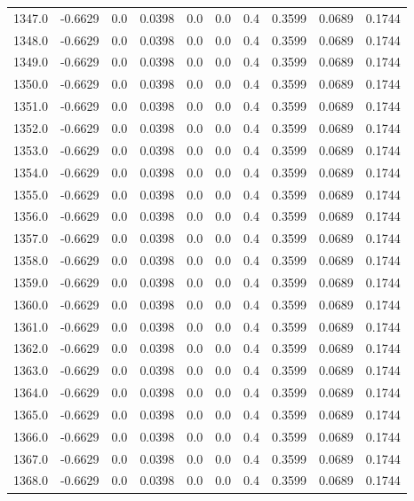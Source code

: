 \begin{longtable}{lrrrrrrrrr}
1347.0 & -0.6629 & 0.0 & 0.0398 & 0.0 & 0.0 & 0.4 & 0.3599 & 0.0689 & 0.1744 \\
1348.0 & -0.6629 & 0.0 & 0.0398 & 0.0 & 0.0 & 0.4 & 0.3599 & 0.0689 & 0.1744 \\
1349.0 & -0.6629 & 0.0 & 0.0398 & 0.0 & 0.0 & 0.4 & 0.3599 & 0.0689 & 0.1744 \\
1350.0 & -0.6629 & 0.0 & 0.0398 & 0.0 & 0.0 & 0.4 & 0.3599 & 0.0689 & 0.1744 \\
1351.0 & -0.6629 & 0.0 & 0.0398 & 0.0 & 0.0 & 0.4 & 0.3599 & 0.0689 & 0.1744 \\
1352.0 & -0.6629 & 0.0 & 0.0398 & 0.0 & 0.0 & 0.4 & 0.3599 & 0.0689 & 0.1744 \\
1353.0 & -0.6629 & 0.0 & 0.0398 & 0.0 & 0.0 & 0.4 & 0.3599 & 0.0689 & 0.1744 \\
1354.0 & -0.6629 & 0.0 & 0.0398 & 0.0 & 0.0 & 0.4 & 0.3599 & 0.0689 & 0.1744 \\
1355.0 & -0.6629 & 0.0 & 0.0398 & 0.0 & 0.0 & 0.4 & 0.3599 & 0.0689 & 0.1744 \\
1356.0 & -0.6629 & 0.0 & 0.0398 & 0.0 & 0.0 & 0.4 & 0.3599 & 0.0689 & 0.1744 \\
1357.0 & -0.6629 & 0.0 & 0.0398 & 0.0 & 0.0 & 0.4 & 0.3599 & 0.0689 & 0.1744 \\
1358.0 & -0.6629 & 0.0 & 0.0398 & 0.0 & 0.0 & 0.4 & 0.3599 & 0.0689 & 0.1744 \\
1359.0 & -0.6629 & 0.0 & 0.0398 & 0.0 & 0.0 & 0.4 & 0.3599 & 0.0689 & 0.1744 \\
1360.0 & -0.6629 & 0.0 & 0.0398 & 0.0 & 0.0 & 0.4 & 0.3599 & 0.0689 & 0.1744 \\
1361.0 & -0.6629 & 0.0 & 0.0398 & 0.0 & 0.0 & 0.4 & 0.3599 & 0.0689 & 0.1744 \\
1362.0 & -0.6629 & 0.0 & 0.0398 & 0.0 & 0.0 & 0.4 & 0.3599 & 0.0689 & 0.1744 \\
1363.0 & -0.6629 & 0.0 & 0.0398 & 0.0 & 0.0 & 0.4 & 0.3599 & 0.0689 & 0.1744 \\
1364.0 & -0.6629 & 0.0 & 0.0398 & 0.0 & 0.0 & 0.4 & 0.3599 & 0.0689 & 0.1744 \\
1365.0 & -0.6629 & 0.0 & 0.0398 & 0.0 & 0.0 & 0.4 & 0.3599 & 0.0689 & 0.1744 \\
1366.0 & -0.6629 & 0.0 & 0.0398 & 0.0 & 0.0 & 0.4 & 0.3599 & 0.0689 & 0.1744 \\
1367.0 & -0.6629 & 0.0 & 0.0398 & 0.0 & 0.0 & 0.4 & 0.3599 & 0.0689 & 0.1744 \\
1368.0 & -0.6629 & 0.0 & 0.0398 & 0.0 & 0.0 & 0.4 & 0.3599 & 0.0689 & 0.1744 \\

\end{longtable}
